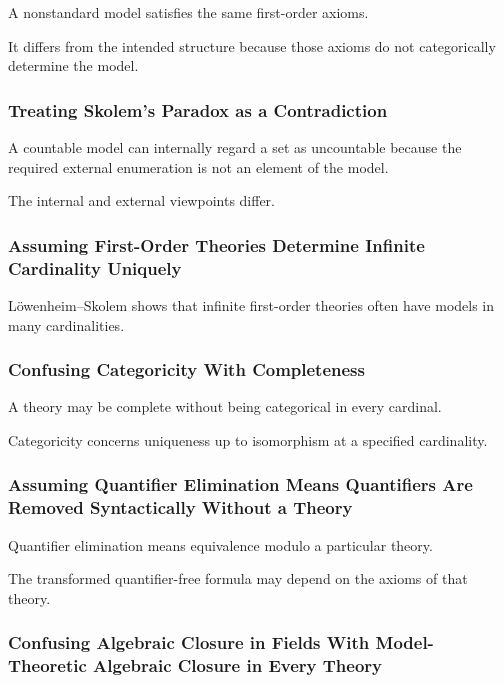 A nonstandard model satisfies the same first-order axioms.

It differs from the intended structure because those axioms do not
categorically determine the model.

\subsubsection{Treating Skolem's Paradox as a Contradiction}

A countable model can internally regard a set as uncountable because the
required external enumeration is not an element of the model.

The internal and external viewpoints differ.

\subsubsection{Assuming First-Order Theories Determine Infinite Cardinality Uniquely}

Löwenheim--Skolem shows that infinite first-order theories often have models
in many cardinalities.

\subsubsection{Confusing Categoricity With Completeness}

A theory may be complete without being categorical in every cardinal.

Categoricity concerns uniqueness up to isomorphism at a specified
cardinality.

\subsubsection{Assuming Quantifier Elimination Means Quantifiers Are Removed Syntactically Without a Theory}

Quantifier elimination means equivalence modulo a particular theory.

The transformed quantifier-free formula may depend on the axioms of that
theory.

\subsubsection{Confusing Algebraic Closure in Fields With Model-Theoretic Algebraic Closure in Every Theory}

